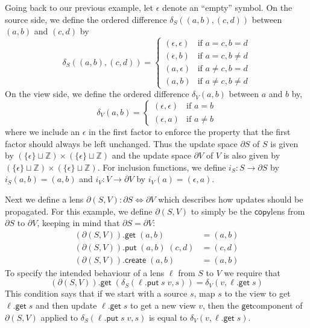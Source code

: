 \documentclass[acmsmall,review,anonymous]{acmart}\settopmatter{printfolios=true,printccs=false,printacmref=false}
\newcommand{\kw}[1]{\ensuremath{\mathsf{#1}}}
\newcommand{\get}{\ensuremath{\kw{get}}}
\newcommand{\pput}{\ensuremath{\kw{put}}}
\newcommand{\create}{\ensuremath{\kw{create}}}
\newcommand{\ccopy}{\ensuremath{\kw{copy}}}
\begin{document}
Going back to our previous example, let $\epsilon$ denote an ``empty''
symbol. On the source side, we define the ordered difference $\delta_S((a, b),
(c, d))$ between $(a, b)$ and $(c, d)$ by
$$\delta_S((a, b), (c,
d)) = \begin{cases}
(\epsilon, \epsilon) & \text{if }a = c, b = d\\
(\epsilon, b) & \text{if }a=c, b \neq d\\
(a, \epsilon) & \text{if }a \neq c, b = d\\
(a, b) & \text{if }a \neq c, b \neq d
\end{cases}$$
On the view side, we define the ordered difference $\delta_V(a, b)$
between $a$ and $b$ by, $$\delta_V(a, b) = \begin{cases}
(\epsilon, \epsilon) & \text{if } a = b\\
(\epsilon, a) & \text{if } a \neq b
\end{cases}$$
where we include an $\epsilon$ in the first factor to enforce the property that
the first factor should always be left unchanged. Thus the update space
$\partial S$ of $S$ is given by $(\{\epsilon\} \sqcup \mathbb{Z})
\times(\{\epsilon\} \sqcup \mathbb{Z})$ and the update space $\partial V$ of
$V$ is also given by $(\{\epsilon\} \sqcup \mathbb{Z}) \times(\{\epsilon\}
\sqcup \mathbb{Z})$. For inclusion functions, we define $i_S : S \longrightarrow
\partial S$ by $i_S(a, b) = (a, b)$ and $i_V : V \longrightarrow \partial V$ by
$i_V(a) = (\epsilon, a)$.

Next we define a lens $\partial(S, V) : \partial S \Leftrightarrow \partial V$
which describes how updates should be propagated. For this example, we
define $\partial(S,V)$ to simply be the \ccopy lens from $\partial S$ to
$\partial V$, keeping in mind that $\partial S = \partial V$:
\begin{align*}
(\partial(S, V)).\get \; (a, b) &= (a, b)\\
(\partial(S, V)).\pput \; (a, b) \; (c, d) &= (c, d)\\
(\partial(S, V)).\create \; (a, b) &= (a, b)
\end{align*}
To specify the intended behaviour of a lens $\ell$ from $S$ to $V$ we
require that
\begin{equation}\label{partialpreservesdelta}
(\partial (S, V)).\get \; (\delta_S(\ell.\pput \; s \; v, s)) = \delta_V(v,
\ell.\get \; s)
\end{equation}
This condition says that if we start with a source $s$, map $s$ to the view
to get $\ell.\get \; s$ and then update $\ell.\get \; s$ to get a new view $v$,
then the \get component of $\partial(S, V)$ applied to $\delta_S(\ell.\pput \; s
\; v, s)$ is equal to $\delta_V(v, \ell.\get \; s)$.
\end{document}
